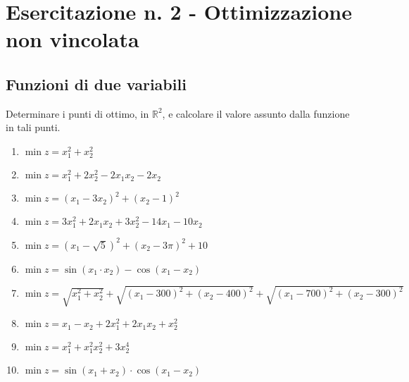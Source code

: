 \documentclass[italian,12pt]{article}
\begin{document}
\pagestyle{empty}

\section*{Esercitazione n. 2 - Ottimizzazione non vincolata}

\subsection*{Funzioni di due variabili}

Determinare i punti di ottimo, in $\mathbb{R}^2$, e calcolare il valore assunto dalla funzione in tali punti.

\begin{enumerate}
	\item $\min z = x_1^2 + x_2^2$
	\item $\min z = x_1^2 + 2 x_2^2 - 2 x_1 x_2 - 2 x_2$
	\item $\min z = (x_1 - 3 x_2)^2 + (x_2 - 1)^2$
	\item $\min z = 3 x_1^2 +2 x_1 x_2 + 3 x_2^2 - 14 x_1 - 10 x_2$
	\item $\min z = (x_1 - \sqrt{5})^2 + (x_2 - 3 \pi)^2 + 10$
	\item $\min z = \sin(x_1 \cdot x_2) - \cos(x_1 - x_2)$
	\item $\min z = \sqrt{x_1^2 + x_2^2} + \sqrt{(x_1-300)^2+(x_2-400)^2} + \sqrt{(x_1-700)^2+(x_2-300)^2}$
	\item $\min z = x_1 - x_2 + 2 x_1^2 + 2 x_1 x_2 + x_2^2$
	\item $\min z = x_1^2 + x_1^2 x_2^2 + 3 x_2^4$
	\item $\min z = \sin(x_1+x_2) \cdot \cos(x_1-x_2)$
\end{enumerate}
\end{document}
